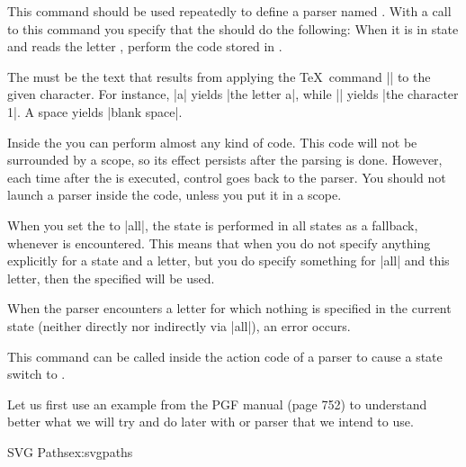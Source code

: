 \begin{command}{\pgfparserdef{}}
  This command should be used repeatedly to define a parser named
  . With a call to this command you specify that the
   should do the following: When it is in state
   and reads the letter , perform the
  code stored in .

  The  must be the text that results from
  applying the \TeX\ command |\meaning| to the given character. For
  instance, |\meaning a| yields |the letter a|, while ||
  yields |the character 1|. A space yields |blank space|. 

  Inside the  you can perform almost any kind of
  code. This code will not be surrounded by a scope, so its effect
  persists after the parsing is done. However, each time after the
   is executed, control goes back to the parser. You
  should not launch a parser inside the  code, unless you
  put it in a scope.

  When you set the  to |all|, the state  is
  performed in all states as a fallback, whenever  is encountered. This means that when you do not specify
  anything explicitly for a state and a letter, but you do specify
  something for |all| and this letter, then the specified
   will be used.

  When the parser encounters a letter for which nothing is specified
  in the current state (neither directly nor indirectly via |all|), an
  error occurs.
\end{command}

\begin{command}{\pgfparserswitch{}}
  This command can be called inside the action code of a parser to
  cause a state switch to .
\end{command}

Let us first use an example from the PGF manual (page 752) to understand better what we will try and do later with
or parser that we intend to use.

\begin{texexample}{SVG Paths}{ex:svgpaths}
\begin{pgfpicture}
\end{pgfpicture}
\end{texexample}

